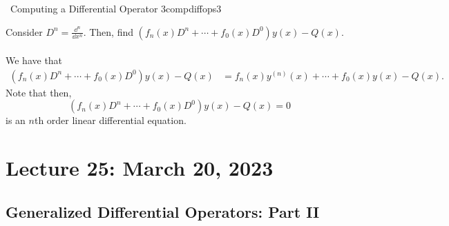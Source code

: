         \begin{example}{\Difficulty\,\Difficulty\,\,Computing a Differential Operator 3}{compdiffops3}

            Consider \(D^n=\frac{\dd^n}{\dd x^n}\). Then, find \((f_n(x)D^n+\cdots+f_0(x)D^0)y(x)-Q(x)\).
            \\
            \\
            We have that
            \begin{align*}
                (f_n(x)D^n+\cdots+f_0(x)D^0)y(x)-Q(x)&=f_n(x)y^{(n)}(x)+\cdots+f_0(x)y(x)-Q(x).
            \end{align*}
            Note that then,
            \begin{equation*}
                (f_n(x)D^n+\cdots+f_0(x)D^0)y(x)-Q(x)=0
            \end{equation*}
            is an \(n\)th order linear differential equation.

        \end{example}

\pagebreak

\section{Lecture 25: March 20, 2023}

    \subsection{Generalized Differential Operators: Part II}

